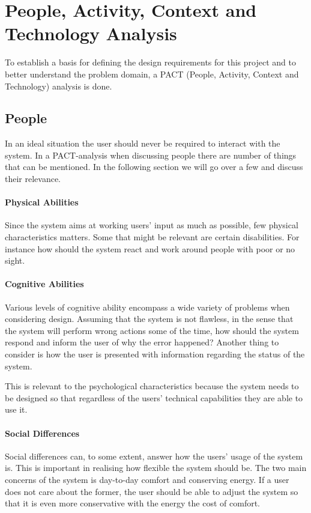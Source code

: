 \section{People, Activity, Context and Technology Analysis}
To establish a basis for defining the design requirements for this project and
to better understand the problem domain, a PACT (People, Activity, Context and Technology) analysis is done.

\subsection{People}
In an ideal situation the user should never be required to interact with the system. In a PACT-analysis when discussing people there are number of things that can be mentioned. In the following section we will go over a few and discuss their relevance.

\paragraph{Physical Abilities}
Since the system aims at working users' input as much as possible, few physical characteristics matters. Some that might be relevant are certain disabilities. For instance how should the system react and work around people with poor or no sight.

\paragraph{Cognitive Abilities}
Various levels of cognitive ability encompass a wide variety of problems
when considering design. Assuming that the system is not flawless, in the
  sense that the system will perform wrong actions some of the time, how should
the system respond and inform the user of why the error happened? Another thing
to consider is how the user is presented with information regarding the status
of the system.

This is relevant to the psychological characteristics because the system needs to be designed so that regardless of the users' technical capabilities they are able to use it.

\paragraph{Social Differences}
Social differences can, to some extent, answer how the users' usage of
the system is. This is important in realising how flexible the system should be.
The two main concerns of the system is day-to-day comfort and conserving energy.
If a user does not care about the former, the user should be able to adjust the system so that it is even more conservative with the energy the cost of comfort.

